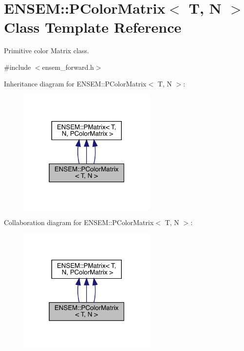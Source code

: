 \hypertarget{classENSEM_1_1PColorMatrix}{}\section{E\+N\+S\+EM\+:\+:P\+Color\+Matrix$<$ T, N $>$ Class Template Reference}
\label{classENSEM_1_1PColorMatrix}


Primitive color Matrix class.  




{\ttfamily \#include $<$ensem\+\_\+forward.\+h$>$}



Inheritance diagram for E\+N\+S\+EM\+:\+:P\+Color\+Matrix$<$ T, N $>$\+:
\nopagebreak
\begin{figure}[H]
\begin{center}
\leavevmode
\includegraphics[width=195pt]{d5/d16/classENSEM_1_1PColorMatrix__inherit__graph}
\end{center}
\end{figure}


Collaboration diagram for E\+N\+S\+EM\+:\+:P\+Color\+Matrix$<$ T, N $>$\+:
\nopagebreak
\begin{figure}[H]
\begin{center}
\leavevmode
\includegraphics[width=195pt]{d0/df4/classENSEM_1_1PColorMatrix__coll__graph}
\end{center}
\end{figure}
